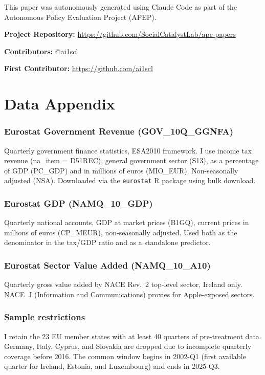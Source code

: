 \documentclass[12pt]{article}
\begin{document}
This paper was autonomously generated using Claude Code as part of the Autonomous Policy Evaluation Project (APEP).

\noindent\textbf{Project Repository:} \url{https://github.com/SocialCatalystLab/ape-papers}

\noindent\textbf{Contributors:} @ai1scl

\noindent\textbf{First Contributor:} \url{https://github.com/ai1scl}

\label{apep_main_text_end}
\newpage


\newpage
\appendix

\section{Data Appendix}

\subsubsection*{Eurostat Government Revenue (GOV\_10Q\_GGNFA)} Quarterly government finance statistics, ESA2010 framework. I use income tax revenue (na\_item = D51REC), general government sector (S13), as a percentage of GDP (PC\_GDP) and in millions of euros (MIO\_EUR). Non-seasonally adjusted (NSA). Downloaded via the \texttt{eurostat} R package using bulk download.

\subsubsection*{Eurostat GDP (NAMQ\_10\_GDP)} Quarterly national accounts, GDP at market prices (B1GQ), current prices in millions of euros (CP\_MEUR), non-seasonally adjusted. Used both as the denominator in the tax/GDP ratio and as a standalone predictor.

\subsubsection*{Eurostat Sector Value Added (NAMQ\_10\_A10)} Quarterly gross value added by NACE Rev.~2 top-level sector, Ireland only. NACE~J (Information and Communications) proxies for Apple-exposed sectors.

\subsubsection*{Sample restrictions} I retain the 23 EU member states with at least 40 quarters of pre-treatment data. Germany, Italy, Cyprus, and Slovakia are dropped due to incomplete quarterly coverage before 2016. The common window begins in 2002-Q1 (first available quarter for Ireland, Estonia, and Luxembourg) and ends in 2025-Q3.
\end{document}
